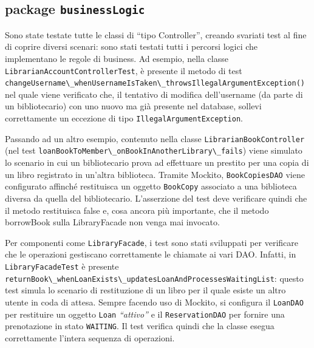 \documentclass[
  italian,
  paper=a4,
  ,captions=tableheading
]{scrbook}
\newcommand{\passthrough}[1]{#1}
\begin{document}
\subsection{\texorpdfstring{package
\texttt{businessLogic}}{package businessLogic}}\label{package-businesslogic}

Sono state testate tutte le classi di ``tipo Controller'', creando
svariati test al fine di coprire diversi scenari: sono stati testati
tutti i percorsi logici che implementano le regole di business. Ad
esempio, nella classe
\passthrough{\lstinline!LibrarianAccountControllerTest!}, è presente il
metodo di test
\passthrough{\lstinline!changeUsername\_whenUsernameIsTaken\_throwsIllegalArgumentException()!}
nel quale viene verificato che, il tentativo di modifica dell'username
(da parte di un bibliotecario) con uno nuovo ma già presente nel
database, sollevi correttamente un eccezione di tipo
\passthrough{\lstinline!IllegalArgumentException!}.

Passando ad un altro esempio, contenuto nella classe
\passthrough{\lstinline!LibrarianBookController!} (nel test
\passthrough{\lstinline!loanBookToMember\_onBookInAnotherLibrary\_fails!})
viene simulato lo scenario in cui un bibliotecario prova ad effettuare
un prestito per una copia di un libro registrato in un'altra biblioteca.
Tramite Mockito, \passthrough{\lstinline!BookCopiesDAO!} viene
configurato affinché restituisca un oggetto
\passthrough{\lstinline!BookCopy!} associato a una biblioteca diversa da
quella del bibliotecario. L'asserzione del test deve verificare quindi
che il metodo restituisca false e, cosa ancora più importante, che il
metodo borrowBook sulla LibraryFacade non venga mai invocato.

Per componenti come \passthrough{\lstinline!LibraryFacade!}, i test sono
stati sviluppati per verificare che le operazioni gestiscano
correttamente le chiamate ai vari DAO. Infatti, in
\passthrough{\lstinline!LibraryFacadeTest!} è presente
\passthrough{\lstinline!returnBook\_whenLoanExists\_updatesLoanAndProcessesWaitingList!}:
questo test simula lo scenario di restituzione di un libro per il quale
esiste un altro utente in coda di attesa. Sempre facendo uso di Mockito,
si configura il \passthrough{\lstinline!LoanDAO!} per restituire un
oggetto \passthrough{\lstinline!Loan!} \emph{``attivo''} e il
\passthrough{\lstinline!ReservationDAO!} per fornire una prenotazione in
stato \passthrough{\lstinline!WAITING!}. Il test verifica quindi che la
classe esegua correttamente l'intera sequenza di operazioni.
\end{document}
